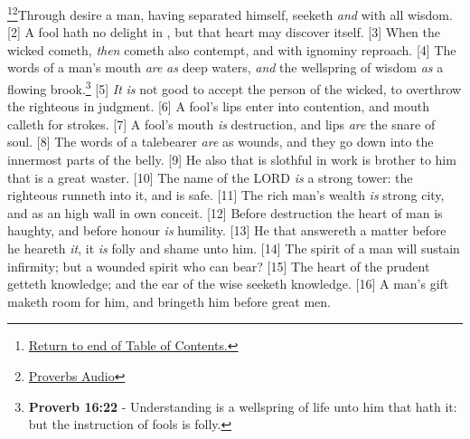 \footnote{\textcolor[cmyk]{0.99998,1,0,0}{\hyperlink{TOC}{Return to end of Table of Contents.}}}\footnote{\href{https://audiobible.com/bible/proverbs_18.html}{\textcolor[cmyk]{0.99998,1,0,0}{Proverbs Audio}}}\textcolor[cmyk]{0.99998,1,0,0}{Through desire a man, having separated himself, seeketh \emph{and}  with all wisdom.}
[2] \textcolor[cmyk]{0.99998,1,0,0}{A fool hath no delight in , but that  heart may discover itself.}
[3] \textcolor[cmyk]{0.99998,1,0,0}{When the wicked cometh, \emph{then} cometh also contempt, and with ignominy reproach.}
[4] \textcolor[cmyk]{0.99998,1,0,0}{The words of a man's mouth \emph{are} \emph{as} deep waters, \emph{and} the wellspring of wisdom \emph{as} a flowing brook.}\footnote{\textbf{Proverb 16:22} - Understanding is a wellspring of life unto him that hath it: but the instruction of fools is folly.}
[5] \textcolor[cmyk]{0.99998,1,0,0}{\emph{It} \emph{is} not good to accept the person of the wicked, to overthrow the righteous in judgment.}
[6] \textcolor[cmyk]{0.99998,1,0,0}{A fool's lips enter into contention, and  mouth calleth for strokes.}
[7] \textcolor[cmyk]{0.99998,1,0,0}{A fool's mouth \emph{is}  destruction, and  lips \emph{are} the snare of  soul.}
[8] \textcolor[cmyk]{0.99998,1,0,0}{The words of a talebearer \emph{are} as wounds, and they go down into the innermost parts of the belly.}
[9] \textcolor[cmyk]{0.99998,1,0,0}{He also that is slothful in  work is brother to him that is a great waster.}
[10] \textcolor[cmyk]{0.99998,1,0,0}{The name of the LORD \emph{is} a strong tower: the righteous runneth into it, and is safe.}
[11] \textcolor[cmyk]{0.99998,1,0,0}{The rich man's wealth \emph{is}  strong city, and as an high wall in  own conceit.}
[12] \textcolor[cmyk]{0.99998,1,0,0}{Before destruction the heart of man is haughty, and before honour \emph{is} humility.}
[13] \textcolor[cmyk]{0.99998,1,0,0}{He that answereth a matter before he heareth \emph{it}, it \emph{is} folly and shame unto him.}
[14] \textcolor[cmyk]{0.99998,1,0,0}{The spirit of a man will sustain  infirmity; but a wounded spirit who can bear?}
[15] \textcolor[cmyk]{0.99998,1,0,0}{The heart of the prudent getteth knowledge; and the ear of the wise seeketh knowledge.}
[16] \textcolor[cmyk]{0.99998,1,0,0}{A man's gift maketh room for him, and bringeth him before great men.}
